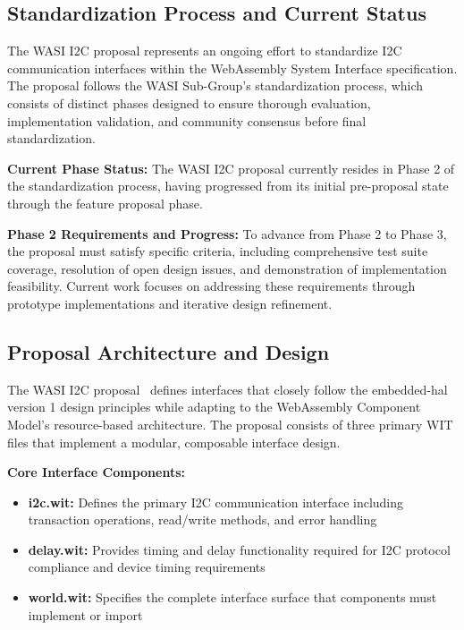 \subsection{Standardization Process and Current Status}
\label{subsec:i2c-standardization-process}

The WASI I2C proposal represents an ongoing effort to standardize I2C communication interfaces within the WebAssembly System Interface specification\cite{wasi_i2c_proposal}. The proposal follows the WASI Sub-Group's standardization process, which consists of distinct phases designed to ensure thorough evaluation, implementation validation, and community consensus before final standardization.

\textbf{Current Phase Status:} The WASI I2C proposal currently resides in Phase 2 of the standardization process, having progressed from its initial pre-proposal state through the feature proposal phase.

\textbf{Phase 2 Requirements and Progress:} To advance from Phase 2 to Phase 3, the proposal must satisfy specific criteria, including comprehensive test suite coverage, resolution of open design issues, and demonstration of implementation feasibility. Current work focuses on addressing these requirements through prototype implementations and iterative design refinement.

\subsection{Proposal Architecture and Design}
\label{subsec:i2c-proposal-design}

The WASI I2C proposal~\cite{wasi_i2c_proposal} defines interfaces that closely follow the embedded-hal version 1 design principles while adapting to the WebAssembly Component Model's resource-based architecture. The proposal consists of three primary WIT files that implement a modular, composable interface design.

\textbf{Core Interface Components:}
\begin{itemize}
    \item \textbf{i2c.wit:} Defines the primary I2C communication interface including transaction operations, read/write methods, and error handling
    \item \textbf{delay.wit:} Provides timing and delay functionality required for I2C protocol compliance and device timing requirements
    \item \textbf{world.wit:} Specifies the complete interface surface that components must implement or import
\end{itemize}

